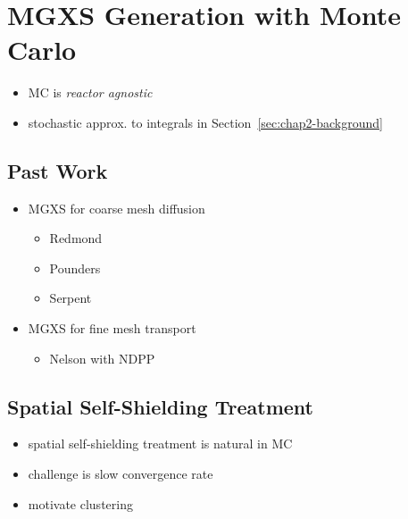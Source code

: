 \section{MGXS Generation with Monte Carlo}
\label{sec:chap2-mgxs-mc}

\begin{itemize}[noitemsep]
  \item \ac{MC} is \emph{reactor agnostic}
  \item stochastic approx. to integrals in Section~\ref{sec:chap2-background}
\end{itemize}

\subsection{Past Work}
\label{subsec:chap2-past-work}

\begin{itemize}[noitemsep]
  \item \ac{MGXS} for coarse mesh diffusion
  \begin{itemize}[noitemsep]
    \item Redmond
    \item Pounders
    \item Serpent
  \end{itemize}
  \item \ac{MGXS} for fine mesh transport
  \begin{itemize}[noitemsep]
    \item Nelson with NDPP
  \end{itemize}
\end{itemize}

\subsection{Spatial Self-Shielding Treatment}
\label{subsec:chap2-spatial-shield}

\begin{itemize}[noitemsep]
  \item spatial self-shielding treatment is natural in \ac{MC}
  \item challenge is slow convergence rate
  \item motivate clustering
\end{itemize}